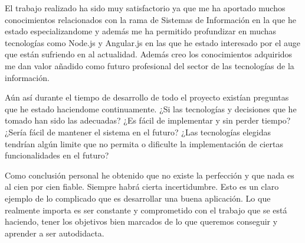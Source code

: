 El trabajo realizado ha sido muy satisfactorio ya que me ha aportado muchos conocimientos relacionados con la rama de Sistemas de Información en la que he estado especializandome y además me ha permitido profundizar en muchas tecnologías como Node.js y Angular.js en las que he estado interesado por el auge que están sufriendo en al actualidad. Además creo los conocimientos adquiridos me dan valor añadido como futuro profesional del sector de las tecnologías de la información.

Aún así durante el tiempo de desarrollo de todo el proyecto existían preguntas que he estado haciendome continuamente. ¿Si las tecnologías y decisiones que he tomado han sido las adecuadas? ¿Es fácil de implementar y sin perder tiempo? ¿Sería fácil de mantener el sistema en el futuro? ¿Las tecnologías elegidas tendrían algún limite que no permita o dificulte la implementación de ciertas funcionalidades en el futuro? 

Como conclusión personal he obtenido que no existe la perfección y que nada es al cien por cien fiable. Siempre habrá cierta incertidumbre. Esto es un claro ejemplo de lo complicado que es desarrollar una buena aplicación. Lo que realmente importa es ser constante y comprometido con el trabajo que se está haciendo, tener los objetivos bien marcados de lo que queremos conseguir y aprender a ser autodidacta. 